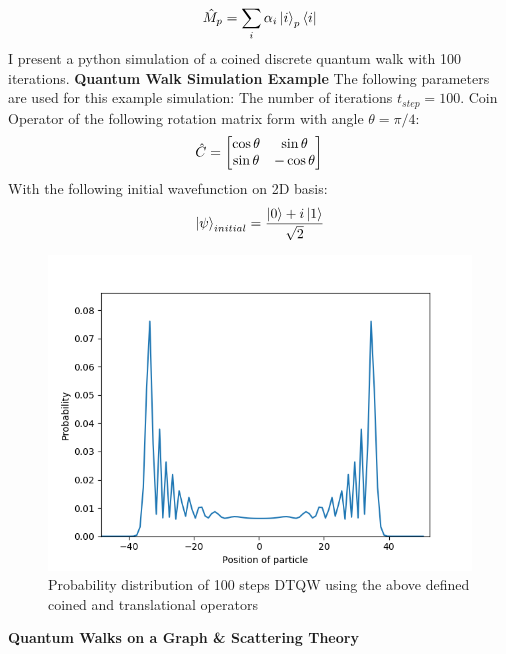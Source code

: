 \begin{equation}
    \Hat{M}_{p} = \sum_{i} \alpha_{i}\ket{i}_{p}\bra{i}
\end{equation}
I present a python simulation of a coined discrete quantum walk with 100 iterations. \newline
\textbf{Quantum Walk Simulation Example} \newline
The following parameters are used for this example simulation: \newline
The number of iterations $t_{step} = 100$. \newline
Coin Operator of the following rotation matrix form with angle $\theta = \pi/4$: 
\begin{equation}
    \Hat{C} = 
    \begin{bmatrix}
    \cos\theta & \sin\theta \\
    \sin\theta & -\cos\theta 
    \end{bmatrix}
\end{equation}
With the following initial wavefunction on 2D basis: 
\begin{equation}
    \ket{\psi}_{initial} = \frac{\ket{0} + i\ket{1}}{\sqrt{2}}
\end{equation}
\begin{figure}[H]
    \centering
    \includegraphics[scale=0.7]{1_Intro/Figures/coined_walk_results.png}
    \caption{Probability distribution of 100 steps DTQW using the above defined coined and translational operators}
    \label{fig:my_label}
\end{figure}
\textbf{Quantum Walks on a Graph \& Scattering Theory} \newline
